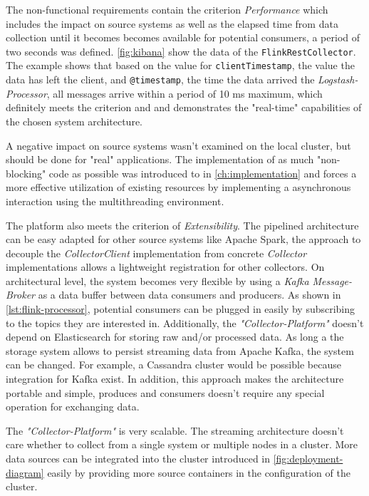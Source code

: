 The non-functional requirements contain the criterion \textit{Performance} which includes the impact on source systems as well as the elapsed time
from data collection until it becomes becomes available for potential consumers, a period of two seconds was defined. \autoref{fig:kibana}
show the data of the \verb|FlinkRestCollector|. The example shows that based on the value for \verb|clientTimestamp|, the value the data has left the client,
and \verb|@timestamp|, the time the data arrived the \textit{Logstash-Processor}, all messages arrive within a period of 10 ms maximum,
which definitely meets the criterion and and demonstrates the "real-time" capabilities of the chosen system architecture.

A negative impact on source systems wasn't examined on the local cluster, but should be done for "real" applications. The implementation
of as much "non-blocking" code as possible was introduced to in \autoref{ch:implementation} and forces a more effective utilization
of existing resources by implementing a asynchronous interaction using the multithreading environment.

The platform also meets the criterion of \textit{Extensibility}. The pipelined architecture can be easy adapted for other source systems
like Apache Spark, the approach to decouple the \textit{CollectorClient} implementation from concrete \textit{Collector} implementations
allows a lightweight registration for other collectors. On architectural level, the system becomes very flexible by using a \textit{Kafka Message-Broker}
as a data buffer between data consumers and producers. As shown in \autoref{lst:flink-processor}, potential consumers can be plugged in easily
by subscribing to the topics they are interested in. Additionally, the \textit{"Collector-Platform"} doesn't depend on Elasticsearch
for storing raw and/or processed data. As long a the storage system allows to persist streaming data from Apache Kafka, the system can be changed.
For example, a Cassandra cluster would be possible because integration for Kafka exist. In addition, this approach makes the architecture portable
and simple, produces and consumers doesn't require any special operation for exchanging data.

The \textit{"Collector-Platform"} is very scalable. The streaming architecture doesn't care whether to collect from a single system
or multiple nodes in a cluster. More data sources can be integrated into the cluster introduced in \autoref{fig:deployment-diagram} easily
by providing more source containers in the configuration of the cluster.

